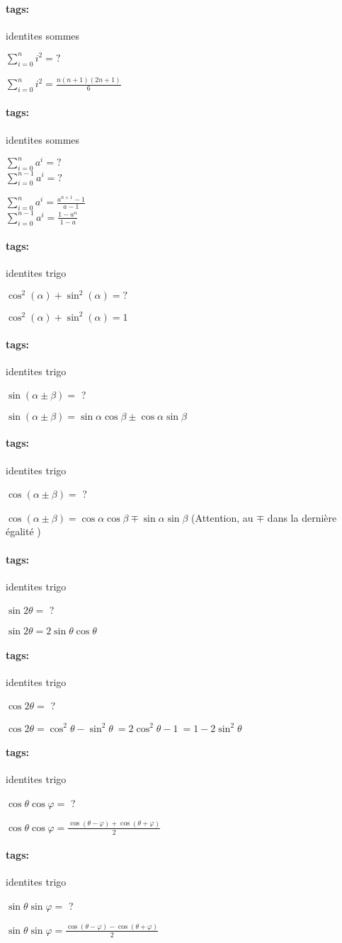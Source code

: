 \documentclass[12pt]{article}
\newcommand*{\xfield}[1]{\begin{mdframed}\centering #1\end{mdframed}\bigskip}
\newenvironment{note}{}{}
\newcommand*{\tags}[1]{\paragraph{tags: }#1}
\begin{document}
\begin{note}
	\tags{identites sommes}
    \xfield{$\sum_{i=0}^n i^2 = ?$}
    \xfield{$\sum_{i=0}^n i^2 = \frac{n(n+1)(2n+1)}{6}$}
\end{note}

\begin{note}
	\tags{identites sommes}
    \xfield{
        $\sum_{i=0}^n a^i = ? $\\        
        $\sum_{i=0}^{n-1} a^i = ? $
    }
    \xfield{$\sum_{i=0}^n a^i = \frac{a^{n+1}-1}{a-1}$\\$\sum_{i=0}^{n-1} a^i = \frac{1-a^{n}}{1-a}$}
\end{note}
\begin{note}
	\tags{identites trigo}
    \xfield{$\cos^2(\alpha) + \sin^2(\alpha) = ?$}
    \xfield{$\cos^2(\alpha) + \sin^2(\alpha) = 1$}
\end{note}

\begin{note}
	\tags{identites trigo}
    \xfield{$\sin(\alpha \pm \beta) =$ ?}
    \xfield{$\sin(\alpha \pm \beta) = \sin \alpha \cos \beta \pm \cos \alpha \sin \beta$}
\end{note}

\begin{note}
	\tags{identites trigo}
    \xfield{$\cos(\alpha \pm \beta) =$ ?}
    \xfield{$\cos(\alpha \pm \beta) = \cos \alpha \cos \beta \mp \sin \alpha \sin \beta$ (Attention, au $\mp$ dans la dernière égalité )}
\end{note}

\begin{note}
	\tags{identites trigo}
    \xfield{$\sin 2\theta =$ ?}
    \xfield{$\sin 2\theta = 2 \sin \theta \cos \theta $}
\end{note}

\begin{note}
	\tags{identites trigo}
    \xfield{$\cos 2\theta =$ ?}
    \xfield{$\cos 2\theta = \cos^2 \theta - \sin^2 \theta \ = 2 \cos^2 \theta - 1\ = 1 - 2 \sin^2 \theta$}
\end{note}

\begin{note}
	\tags{identites trigo}
    \xfield{$\cos \theta \cos \varphi =$ ?}
    \xfield{$\cos \theta \cos \varphi = \frac{\cos(\theta - \varphi) + \cos(\theta + \varphi)} {2}$}
\end{note}

\begin{note}
	\tags{identites trigo}
    \xfield{$\sin \theta \sin \varphi =$ ?}
    \xfield{$\sin \theta \sin \varphi = \frac{\cos(\theta - \varphi) - \cos(\theta + \varphi)} {2}$}
\end{note}
\end{document}
